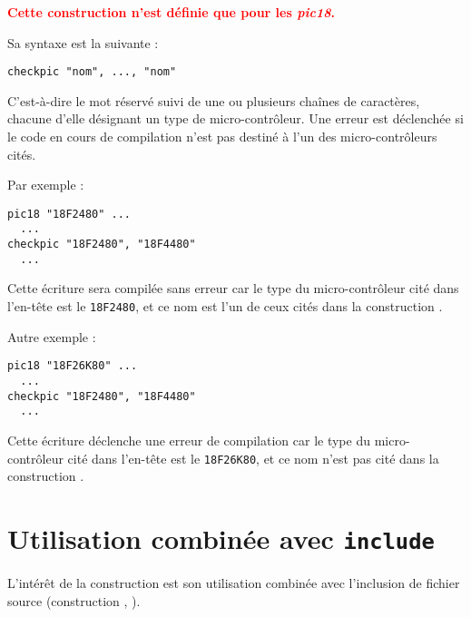 
\cleardoublepage


\thispagestyle{empty}

\textcolor{red}{\bf Cette construction n'est définie que pour les \emph{pic18}.}

Sa syntaxe est la suivante :

\begin{lstlisting}[language=piccolo]
checkpic "nom", ..., "nom"
\end{lstlisting}

C'est-à-dire le mot réservé  suivi de une ou plusieurs chaînes de caractères, chacune d'elle désignant un type de micro-contrôleur. Une erreur est déclenchée si le code en cours de compilation n'est pas destiné à l'un des micro-contrôleurs cités.

Par exemple :

\begin{lstlisting}[language=piccolo]
pic18 "18F2480" ...
  ...
checkpic "18F2480", "18F4480"
  ...
\end{lstlisting}

Cette écriture sera compilée sans erreur car le type du micro-contrôleur cité dans l'en-tête est le \texttt{18F2480}, et ce nom est l'un de ceux cités dans la construction .

Autre exemple :

\begin{lstlisting}[language=piccolo]
pic18 "18F26K80" ...
  ...
checkpic "18F2480", "18F4480"
  ...
\end{lstlisting}

Cette écriture déclenche une erreur de compilation car le type du micro-contrôleur cité dans l'en-tête est le \texttt{18F26K80}, et ce nom n'est pas cité dans la construction .




\section{Utilisation combinée avec \texttt{include}}
L'intérêt de la construction  est son utilisation combinée avec l'inclusion de fichier source (construction , ).

